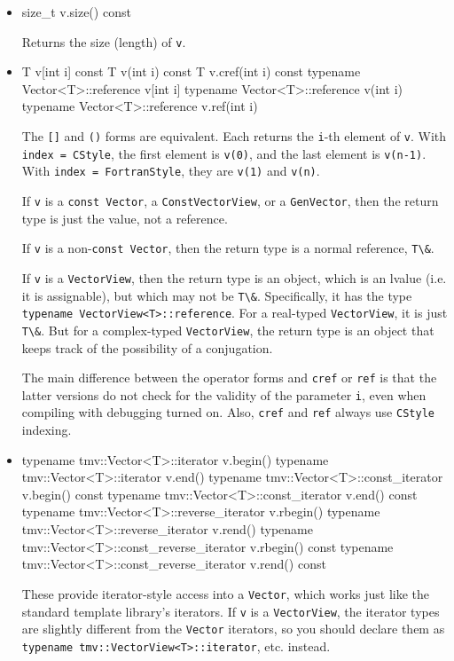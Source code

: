 \documentclass[twoside,letterpaper,11pt]{article}
\renewcommand{\tt}[1]{{\lstinline {#1}}}
\begin{document}
\begin{itemize}
\item
\begin{tmvcode}
size_t v.size() const
\end{tmvcode}
Returns the size (length) of \tt{v}.

\item
\begin{tmvcode}
T v[int i] const
T v(int i) const
T v.cref(int i) const
typename Vector<T>::reference v[int i]
typename Vector<T>::reference v(int i)
typename Vector<T>::reference v.ref(int i)
\end{tmvcode}
The \tt{[]} and \tt{()} forms are equivalent.  Each returns the \tt{i}-th element of \tt{v}.  
With \tt{index = CStyle}, the first 
element is \tt{v(0)}, and the last element is \tt{v(n-1)}.
With \tt{index = FortranStyle}, they are \tt{v(1)} and \tt{v(n)}.

If \tt{v} is a 
\tt{const Vector}, a \tt{ConstVectorView}, or a \tt{GenVector}, 
then the return type is just the value, not a reference.

If \tt{v} is a 
non-\tt{const Vector}, then the return type is a normal reference, \tt{T\&}.

If \tt{v} is a \tt{VectorView}, then the return type is an object, which is
an lvalue (i.e. it is assignable), but which may not be \tt{T\&}.
Specifically, it has the type \tt{typename VectorView<T>::reference}.
For a real-typed \tt{VectorView}, it is just \tt{T\&}.  But for a
complex-typed \tt{VectorView}, the return type is an object that keeps track of the
possibility of a conjugation.

The main difference between the operator forms and \tt{cref} or \tt{ref} is that the latter versions do not
check for the validity of the parameter \tt{i}, even when compiling with debugging turned on.
Also, \tt{cref} and \tt{ref} always use \tt{CStyle} indexing.


\item
\begin{tmvcode}
typename tmv::Vector<T>::iterator v.begin()
typename tmv::Vector<T>::iterator v.end()
typename tmv::Vector<T>::const_iterator v.begin() const
typename tmv::Vector<T>::const_iterator v.end() const
typename tmv::Vector<T>::reverse_iterator v.rbegin()
typename tmv::Vector<T>::reverse_iterator v.rend()
typename tmv::Vector<T>::const_reverse_iterator v.rbegin() const
typename tmv::Vector<T>::const_reverse_iterator v.rend() const
\end{tmvcode}
These provide iterator-style access into a \tt{Vector}, which works just like
the standard template library's iterators.  If \tt{v} is a \tt{VectorView},
the iterator types are slightly different from the \tt{Vector} iterators, 
so you should declare them as \tt{typename tmv::VectorView<T>::iterator},
etc. instead.

\end{itemize}
\end{document}
